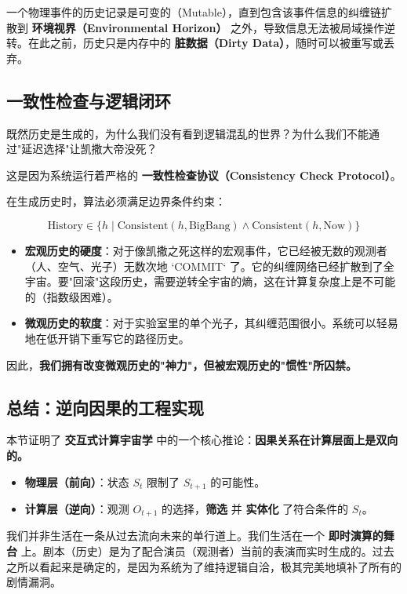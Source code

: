 \begin{theorem}[历史易变性定理]
一个物理事件的历史记录是可变的（Mutable），直到包含该事件信息的纠缠链扩散到 \textbf{环境视界（Environmental Horizon）} 之外，导致信息无法被局域操作逆转。在此之前，历史只是内存中的 \textbf{脏数据（Dirty Data）}，随时可以被重写或丢弃。
\end{theorem}

\subsection{一致性检查与逻辑闭环}

既然历史是生成的，为什么我们没有看到逻辑混乱的世界？为什么我们不能通过"延迟选择"让凯撒大帝没死？

这是因为系统运行着严格的 \textbf{一致性检查协议（Consistency Check Protocol）}。

在生成历史时，算法必须满足边界条件约束：

\begin{equation}
\text{History} \in \{ h \mid \text{Consistent}(h, \text{BigBang}) \land \text{Consistent}(h, \text{Now}) \}
\end{equation}

\begin{itemize}
\item \textbf{宏观历史的硬度}：对于像凯撒之死这样的宏观事件，它已经被无数的观测者（人、空气、光子）无数次地 `COMMIT` 了。它的纠缠网络已经扩散到了全宇宙。要"回滚"这段历史，需要逆转全宇宙的熵，这在计算复杂度上是不可能的（指数级困难）。

\item \textbf{微观历史的软度}：对于实验室里的单个光子，其纠缠范围很小。系统可以轻易地在低开销下重写它的路径历史。
\end{itemize}

因此，\textbf{我们拥有改变微观历史的"神力"，但被宏观历史的"惯性"所囚禁。}

\subsection{总结：逆向因果的工程实现}

本节证明了 \textbf{交互式计算宇宙学} 中的一个核心推论：\textbf{因果关系在计算层面上是双向的。}

\begin{itemize}
\item \textbf{物理层（前向）}：状态 $S_t$ 限制了 $S_{t+1}$ 的可能性。

\item \textbf{计算层（逆向）}：观测 $O_{t+1}$ 的选择，\textbf{筛选} 并 \textbf{实体化} 了符合条件的 $S_t$。
\end{itemize}

我们并非生活在一条从过去流向未来的单行道上。我们生活在一个 \textbf{即时演算的舞台} 上。剧本（历史）是为了配合演员（观测者）当前的表演而实时生成的。过去之所以看起来是确定的，是因为系统为了维持逻辑自洽，极其完美地填补了所有的剧情漏洞。
